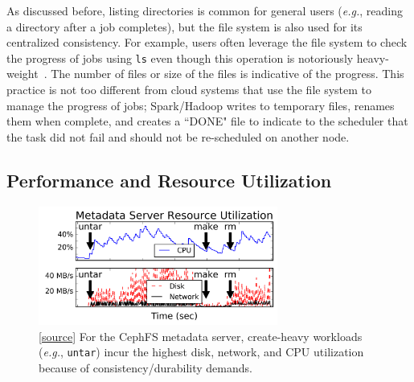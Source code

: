 As discussed before, listing directories is common for general users ({\it e.g.}, reading a
directory after a job completes), but the file system is also used for its
centralized consistency.  For example, users often leverage the file system to
check the progress of jobs using \texttt{ls} even though this operation is
notoriously heavy-weight~\cite{carns:ipdps09-pvfs, eshel:fast10-panache}. The
number of files or size of the files is indicative of the progress. This
practice is not too different from cloud systems that use the file system to
manage the progress of jobs; Spark/Hadoop writes to temporary files, renames
them when complete, and creates a ``DONE" file to indicate to the scheduler that
the task did not fail and should not be re-scheduled on another node.

\subsection{Performance and Resource Utilization}

\begin{figure}[t]
  \centering
  \includegraphics[width=0.7\textwidth]{./chapters/cudele/figures/overhead-creates.png}
  \caption{[\href{https://github.com/michaelsevilla/cudele-popper/blob/master/experiments/baseline-compile/visualize/viz.ipynb}{source}]
  For the CephFS metadata server, create-heavy workloads ({\it e.g.},
  \texttt{untar}) incur the highest disk, network, and CPU utilization because of
  consistency/durability demands.}\label{fig:overhead-creates}
\end{figure}

